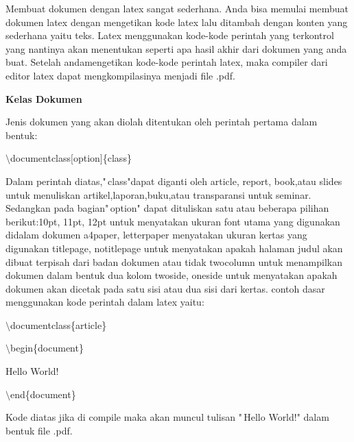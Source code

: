Membuat dokumen dengan latex sangat sederhana. Anda bisa memulai membuat dokumen latex dengan mengetikan kode latex lalu ditambah dengan konten yang sederhana yaitu teks. Latex menggunakan kode-kode perintah yang terkontrol yang nantinya akan menentukan seperti apa hasil akhir dari dokumen yang anda buat. Setelah andamengetikan kode-kode perintah latex, maka compiler dari editor latex dapat mengkompilasinya menjadi file .pdf. \par \vspace{12pt} 

\textbf{Kelas Dokumen}\par
\vspace{12pt}
Jenis dokumen yang akan diolah ditentukan oleh perintah pertama dalam bentuk: \par \vspace{12pt} $\setminus$documentclass$[$option$]$\{class\}\par \vspace{12pt}

Dalam perintah diatas,"\,class"dapat diganti oleh article, report, book,atau slides untuk menuliskan artikel,laporan,buku,atau transparansi untuk seminar. Sedangkan pada bagian"\,option" dapat dituliskan satu 
atau beberapa pilihan berikut:10pt, 11pt, 12pt untuk menyatakan ukuran font utama yang digunakan didalam dokumen a4paper, letterpaper menyatakan ukuran kertas yang digunakan titlepage, notitlepage untuk menyatakan apakah halaman judul akan dibuat terpisah dari badan dokumen atau tidak twocolumn untuk menampilkan dokumen dalam bentuk dua kolom twoside, oneside untuk menyatakan apakah dokumen akan dicetak pada satu 
sisi atau dua sisi dari kertas. contoh dasar menggunakan kode perintah dalam latex yaitu:\par \vspace{12pt}

$\setminus$documentclass\{article\}\par \vspace{12pt}

$\setminus$begin\{document\}\par \vspace{12pt}

Hello World!\par \vspace{12pt}

$\setminus$end\{document\}\par \vspace{12pt}

Kode diatas jika di compile maka akan muncul tulisan "\,Hello World!" 
dalam bentuk file .pdf.\par \vspace{12pt}

